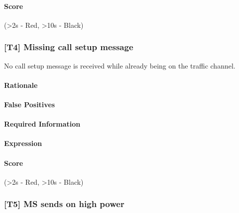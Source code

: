 \documentclass[a4paper,11pt,notitlepage,bigheadings,oneside]{scrartcl}
\begin{document}
\TBD{}

\paragraph{Score}

\TBD{} (\textgreater 2s - Red, \textgreater 10s - Black)


\subsubsection{[T4] Missing call setup message}

No call setup message is received while already being on the traffic channel.

\paragraph{Rationale}

\TBD{}

\paragraph{False Positives}

\TBD{}

\paragraph{Required Information}

\TBD{}

\paragraph{Expression}

\TBD{}

\paragraph{Score}

\TBD{} (\textgreater 2s - Red, \textgreater 10s - Black)


\subsubsection{[T5] MS sends on high power}
\end{document}
